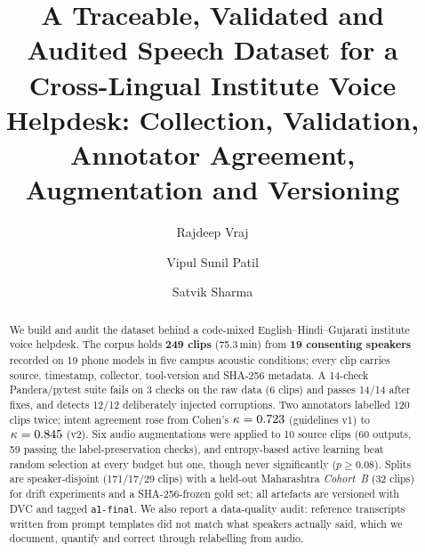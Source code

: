 \documentclass[sigconf,authordraft]{acmart}
\begin{document}
\title[Project 5 -- Assignment 1: Voice Helpdesk Data]{%
  A Traceable, Validated and Audited Speech Dataset for a Cross-Lingual Institute Voice Helpdesk:
  Collection, Validation, Annotator Agreement, Augmentation and Versioning}

\author{Rajdeep Vraj}
\author{Vipul Sunil Patil}
\authornotemark[1]
\author{Satvik Sharma}
\authornotemark[1]
\renewcommand{\shortauthors}{Vraj, Patil and Sharma}

\begin{abstract}
We build and audit the dataset behind a code-mixed English--Hindi--Gujarati institute voice helpdesk.
The corpus holds \textbf{249 clips} (75.3\,min) from \textbf{19 consenting speakers} recorded on 19 phone models in five campus acoustic conditions;
every clip carries source, timestamp, collector, tool-version and SHA-256 metadata.
A 14-check Pandera/pytest suite fails on 3 checks on the raw data (6 clips) and passes 14/14 after fixes, and detects 12/12 deliberately injected corruptions.
Two annotators labelled 120 clips twice; intent agreement rose from Cohen's $\kappa=0.723$ (guidelines v1) to $\kappa=0.845$ (v2).
Six audio augmentations were applied to 10 source clips (60 outputs, 59 passing the label-preservation checks), and entropy-based active learning beat random selection at every budget but one, though never significantly ($p\ge0.08$).
Splits are speaker-disjoint (171/17/29 clips) with a held-out Maharashtra \emph{Cohort~B} (32 clips) for drift experiments and a SHA-256-frozen gold set; all artefacts are versioned with DVC and tagged \texttt{a1-final}.
We also report a data-quality audit: reference transcripts written from prompt templates did not match what speakers actually said, which we document, quantify and correct through relabelling from audio.
\end{abstract}
\end{document}
